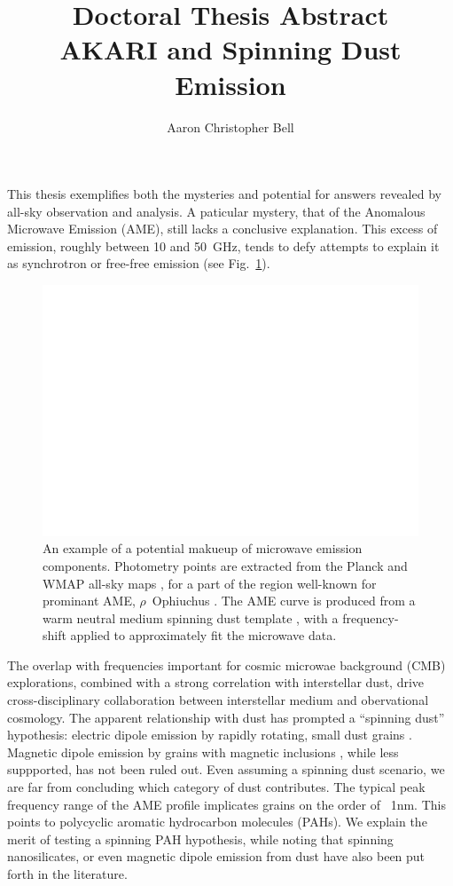 \documentclass[12pt,a4paper]{article}
\title{Doctoral Thesis Abstract\\
AKARI and Spinning Dust Emission\\
}
\date{}
\author{Aaron Christopher Bell}
\begin{document}
\maketitle

This thesis exemplifies both the mysteries and potential for answers revealed by all-sky observation and analysis. A paticular mystery, that of the Anomalous Microwave Emission (AME), still lacks a conclusive explanation.  This excess of emission, roughly between 10 and 50~GHz, tends to defy attempts to explain it as synchrotron or free-free emission (see Fig.~\ref{fig:mw_foregrounds_demo_rOph}).
      \begin{figure}[h]
        \centering
        \includegraphics[width=\textwidth/2]{../Plots/ch_intro/mw_foregrounds_demo_rOph.pdf}
          \caption{\small An example of a potential makueup of microwave emission components. Photometry points are extracted from the Planck and WMAP all-sky maps \citep{hfi14viii}, for a part of the region well-known for prominant AME, $\rho$~Ophiuchus \citep{planckxx11}. The AME curve is produced from a warm neutral medium spinning dust template \citep{ali-haimoud09}, with a frequency-shift applied to approximately fit the microwave data.}
        \label{fig:mw_foregrounds_demo_rOph}
      \end{figure}
The overlap with frequencies important for cosmic microwae background (CMB) explorations, combined with a strong correlation with interstellar dust, drive cross-disciplinary collaboration between interstellar medium and obervational cosmology. The apparent relationship with dust has prompted a ``spinning dust'' hypothesis:  electric dipole emission by rapidly rotating, small dust grains \citep{erickson57,draine98a}. Magnetic dipole emission by grains with magnetic inclusions \citep{draine99}, while less suppported, has not been ruled out. Even assuming a spinning dust scenario, we are far from concluding which category of dust contributes. The typical peak frequency range of the AME profile implicates grains on the order of ~1nm. This points to polycyclic aromatic hydrocarbon molecules (PAHs). We explain the merit of testing a spinning PAH hypothesis, while noting that spinning nanosilicates, or even magnetic dipole emission from dust have also been put forth in the literature.
\end{document}

